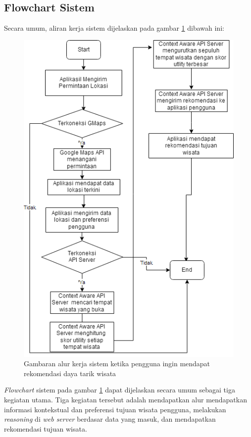 \subsection{Flowchart Sistem}
Secara umum, aliran kerja sistem dijelaskan pada gambar \ref{fig:flowchart} dibawah ini:
\begin{figure}[h!]
    \centering
    \includegraphics[scale=0.6]{img/flowchart-general.png}
    \caption{Gambaran alur kerja sistem ketika pengguna ingin mendapat rekomendasi daya tarik wisata}
    \label{fig:flowchart}
\end{figure}
\textit{Flowchart} sistem pada gambar \ref{fig:flowchart} dapat dijelaskan secara umum sebagai tiga kegiatan utama. Tiga kegiatan tersebut adalah mendapatkan alur mendapatkan informasi kontekstual dan preferensi tujuan wisata pengguna, 
melakukan \textit{reasoning} di \textit{web server} berdasar data yang masuk, dan mendapatkan rekomendasi tujuan wisata.
\cleardoublepage
\par
